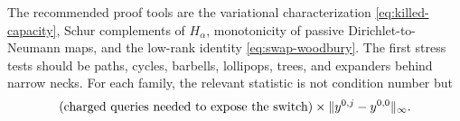 The recommended proof tools are the variational characterization
\cref{eq:killed-capacity}, Schur complements of $H_\alpha$, monotonicity of
passive Dirichlet-to-Neumann maps, and the low-rank identity
\cref{eq:swap-woodbury}.  The first stress tests should be paths, cycles,
barbells, lollipops, trees, and expanders behind narrow necks.  For each
family, the relevant statistic is not condition number but
\begin{equation}
 (\text{charged queries needed to expose the switch})
 \times
 \lVert y^{0,j}-y^{0,0}\rVert_\infty.
 \label{eq:swap-search-statistic}
\end{equation}
